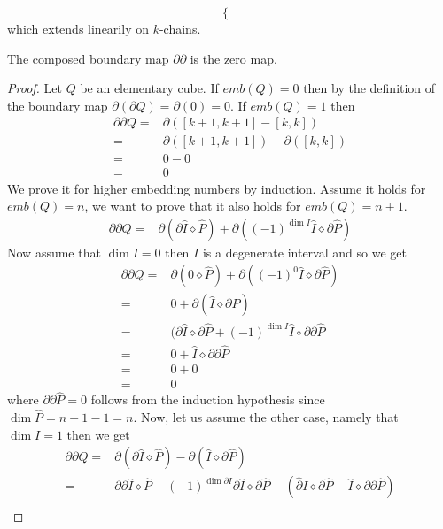 \begin{example}
\begin{definition}
\[\begin{cases}
    \end{cases}
  \]
  which extends linearily on $k$-chains.
\end{definition}
\begin{theorem}
The composed boundary map $\partial \partial$ is the zero map.
\end{theorem}
\begin{proof}
  Let $Q$ be an elementary cube. If $emb(Q)=0$ then by the definition of the boundary map $\partial (\partial Q) = \partial(0) = 0$. If $emb(Q)=1$ then
  \begin{align*}
    \partial \partial Q =& \partial([k+1,k+1]-[k,k]) \\ =&\partial([k+1,k+1])-\partial([k,k])
                                                          \\=&0-0\\=&0
  \end{align*}
We prove it for higher embedding numbers by induction. Assume it holds for $emb(Q)=n$, we want to prove that it also holds for $emb(Q)=n+1$.
\begin{align*}
  \partial \partial Q =& \partial(\partial \hat I \diamond \hat P) + \partial((-1)^{\dim I} \hat I \diamond \partial \hat P)
\end{align*}
Now assume that $\dim I = 0$ then $I$ is a degenerate interval and so we get
\begin{align*}
  \partial \partial Q =& \partial(0 \diamond \hat P) + \partial((-1)^{0} \hat I \diamond \partial \hat P) \\
  =& 0 + \partial( \hat I \diamond \partial \hat P) \\
  =& (\partial \hat I \diamond \partial \hat P + (-1)^{\dim I} \hat I \circ \partial \partial \hat P \\
  =& 0 + \hat I \diamond \partial \partial \hat P \\
  =& 0 + 0 \\
  =& 0
\end{align*}
where $\partial \partial \hat P = 0$ follows from the induction hypothesis since $\dim \hat P = n+1-1=n$. Now, let us assume the other case, namely that $\dim I = 1$ then we get
\begin{align*}
\partial \partial Q =& \partial(\partial \hat I \diamond \hat P) - \partial( \hat I \diamond \partial \hat P)\\
=& \partial \partial \hat I \diamond \hat P + (-1)^{\dim \partial I} \partial \hat I \diamond \partial \hat P - (\hat \partial I \diamond \partial \hat P - \hat I \diamond \partial \partial \hat P)\\

\end{align*}
\end{proof}
\end{example}
